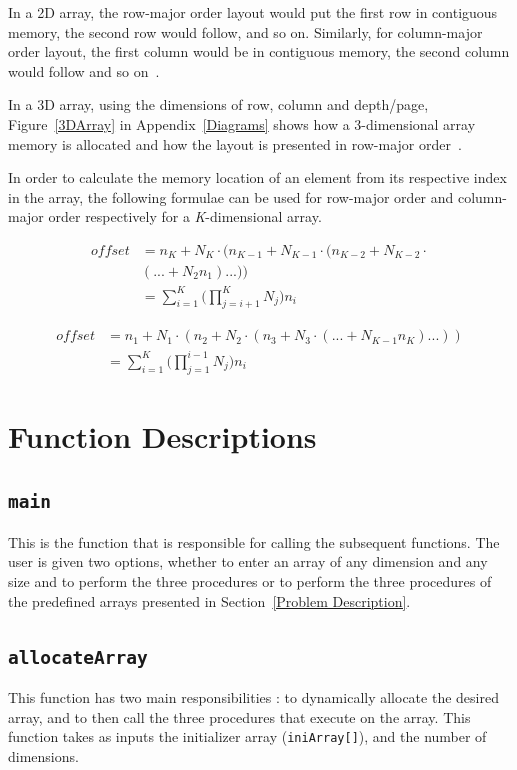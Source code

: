 \documentclass[10pt, conference]{IEEEtran}
\begin{document}
In a 2D array, the row-major order layout would put the first row in contiguous memory, the second row would follow, and so on. Similarly, for column-major order layout, the first column would be in contiguous memory, the second column would follow and so on~\cite{Eli}.

In a 3D array, using the dimensions of row, column and depth/page, Figure~\ref{3DArray} in Appendix~\ref{Diagrams} shows how a 3-dimensional array memory is allocated and how the layout is presented in row-major order~\cite{Eli}.

In order to calculate the memory location of an element from its respective index in the array, the following formulae can be used for row-major order and column-major order respectively for a \emph{K}-dimensional array.


\begin{equation}
\label{eqn1}
\begin{split}
offset &= n_K + N_K \cdot (n_{K-1} +N_{K-1} \cdot (n_{K-2} +N_{K-2} \cdot\\& (...+N_2n_1)...) )\\
&= \sum_{i=1}^{K} \bigg(\prod_{j=i+1}^{K} N_j \bigg) n_i
\end{split}
\end{equation}

\begin{equation}
\label{eqn2}
\begin{split}
offset &= n_1 + N_1 \cdot (n_2 +N_2 \cdot (n_3 +N_3 \cdot (...+N_{K-1}n_K)...) )\\
	&= \sum_{i=1}^{K} \bigg(\prod_{j=1}^{i-1} N_j \bigg) n_i
\end{split}
\end{equation}

\section{Function Descriptions}
\label{Function Description}
\subsection{\texttt{main}}
This is the function that is responsible for calling the subsequent functions. The user is given two options, whether to enter an array of any dimension and any size and to perform the three procedures or to perform the three procedures of the predefined arrays presented in Section~\ref{Problem Description}.

\subsection{\texttt{allocateArray}}
This function has two main responsibilities : to dynamically allocate the desired array, and to then call the three procedures that execute on the array.
This function takes as inputs the initializer array (\texttt{iniArray[]}), and the number of dimensions.
\end{document}

